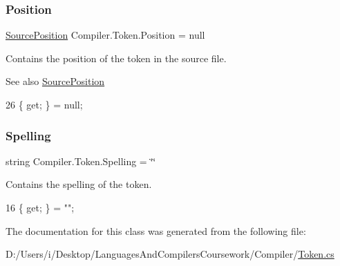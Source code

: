 \subsubsection{\texorpdfstring{Position}{Position}}
{\footnotesize\ttfamily \mbox{\hyperlink{class_compiler_1_1_source_position}{Source\+Position}} Compiler.\+Token.\+Position = null\hspace{0.3cm}{\ttfamily [get]}}

Contains the position of the token in the source file. \begin{DoxySeeAlso}{See also}
\mbox{\hyperlink{class_compiler_1_1_source_position}{Source\+Position}} 
\end{DoxySeeAlso}

\begin{DoxyCode}
26 \{ \textcolor{keyword}{get}; \} = null;
\end{DoxyCode}
\mbox{\label{class_compiler_1_1_token_af1d95b32f5d1b3f103a10c11ac2f2ac2}} 
\subsubsection{\texorpdfstring{Spelling}{Spelling}}
{\footnotesize\ttfamily string Compiler.\+Token.\+Spelling = \char`\"{}\char`\"{}\hspace{0.3cm}{\ttfamily [get]}}

Contains the spelling of the token. 
\begin{DoxyCode}
16 \{ \textcolor{keyword}{get}; \} = \textcolor{stringliteral}{""};
\end{DoxyCode}


The documentation for this class was generated from the following file\+:\begin{DoxyCompactItemize}
\item 
D\+:/\+Users/i/\+Desktop/\+Languages\+And\+Compilers\+Coursework/\+Compiler/\mbox{\hyperlink{_token_8cs}{Token.\+cs}}\end{DoxyCompactItemize}
